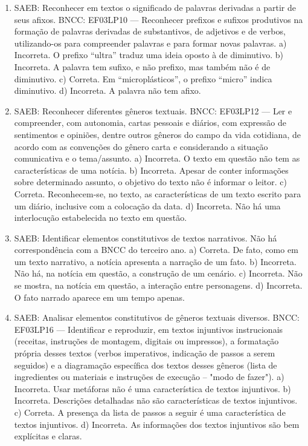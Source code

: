 \begin{enumerate}
\item
SAEB: Reconhecer em textos o significado de palavras derivadas a partir de seus afixos. BNCC: EF03LP10 --- Reconhecer prefixos e sufixos produtivos na formação de palavras derivadas de substantivos, de adjetivos e de verbos, utilizando-os para compreender palavras e para formar novas palavras. a) Incorreta. O prefixo ``ultra'' traduz uma ideia oposto à de diminutivo. b) Incorreta. A palavra tem sufixo, e não prefixo, mas também não é de diminutivo. c) Correta. Em ``microplásticos'', o prefixo ``micro'' indica diminutivo.
d) Incorreta. A palavra não tem afixo.

\item
SAEB: Reconhecer diferentes gêneros textuais. BNCC: EF03LP12 --- Ler e compreender, com autonomia, cartas pessoais e diários, com expressão de sentimentos e opiniões, dentre outros gêneros do campo da vida cotidiana, de acordo com as convenções do gênero carta e considerando a situação comunicativa e o tema/assunto. a) Incorreta. O texto em questão não tem as características de uma notícia. b) Incorreta. Apesar de conter informações sobre determinado assunto, o objetivo do texto não é informar o leitor. c) Correta. Reconhecem-se, no texto, as características de um texto escrito para um diário, inclusive com a colocação da data. d) Incorreta. Não há uma interlocução estabelecida no texto em questão.

\item
SAEB: Identificar elementos constitutivos de textos narrativos. Não há correspondência com a BNCC do terceiro ano. a) Correta. De fato, como em um texto narrativo, a notícia apresenta a narração de um fato. b) Incorreta. Não há, na notícia em questão, a construção de um cenário. c) Incorreta. Não se mostra, na notícia em questão, a interação entre personagens. d) Incorreta. O fato narrado aparece em um tempo apenas.

\item
SAEB: Analisar elementos constitutivos de gêneros textuais diversos. BNCC: EF03LP16 --- Identificar e reproduzir, em textos injuntivos instrucionais (receitas, instruções de montagem, digitais ou impressos), a formatação própria desses textos (verbos imperativos, indicação de passos a serem seguidos) e a diagramação específica dos textos desses gêneros (lista de ingredientes ou materiais e instruções de execução -- "modo de fazer"). a) Incorreta. Usar metáforas não é uma característica de textos injuntivos. b) Incorreta. Descrições detalhadas não são características de textos injuntivos. c) Correta. A presença da lista de passos a seguir é uma característica de textos injuntivos. d) Incorreta. As informações dos textos injuntivos são bem explícitas e claras. 


\end{enumerate}
